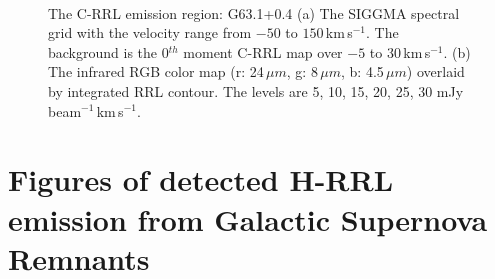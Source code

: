 \documentclass[manuscript]{aastex61}
\newcommand{\kms}{\,km\,s$^{-1}$}
\newcommand{\um}{\mu m}
\begin{document}
\begin{figure}[H]
\centering
{}
\\ 
\caption{The C-RRL emission region: G63.1+0.4
          (a) The SIGGMA spectral grid with the velocity range from $-50$ to $150$\kms.
	  The background is the 0$^{th}$ moment C-RRL map over $-5$ to $30$\kms.
	  (b) The infrared RGB color map (r: 24\,$\um$, g: 8\,$\um$, b: 4.5\,$\um$) overlaid by integrated RRL contour.
	  The levels are 5, 10, 15, 20, 25, 30 mJy\,beam$^{-1}$\kms.}
\label{fig_crrl-g631}
\end{figure}

\newpage

\section{Figures of detected H-RRL emission from Galactic Supernova Remnants}\label{appe:snr}
\end{document}
